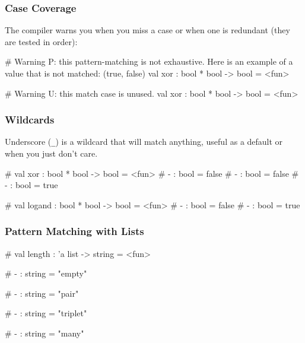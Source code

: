 \documentclass{plt}
\begin{document}
\begin{frame}[fragile]
  \frametitle{Case Coverage}

The compiler warns you when you miss a case or when one is redundant
(they are tested in order):

\begin{interactive}
# 
Warning P: this pattern-matching is not exhaustive.
Here is an example of a value that is not matched:
(true, false)
val xor : bool * bool -> bool = <fun>

# 
Warning U: this match case is unused.
val xor : bool * bool -> bool = <fun>
\end{interactive}

\end{frame}

\begin{frame}[fragile]
  \frametitle{Wildcards}

Underscore (\verb|_|) is a wildcard that will match anything, useful
as a default or when you just don't care.

\begin{interactive}
# 
val xor : bool * bool -> bool = <fun>
# 
- : bool = false
# 
- : bool = false
# 
- : bool = true

# 
val logand : bool * bool -> bool = <fun>
# 
- : bool = false
# 
- : bool = true
\end{interactive}

\end{frame}

\begin{frame}[fragile]
  \frametitle{Pattern Matching with Lists}

\begin{interactive}
# 
val length : 'a list -> string = <fun>

# 
- : string = "empty"

# 
- : string = "pair"

# 
- : string = "triplet"

# 
- : string = "many"
\end{interactive}

\end{frame}
\end{document}
